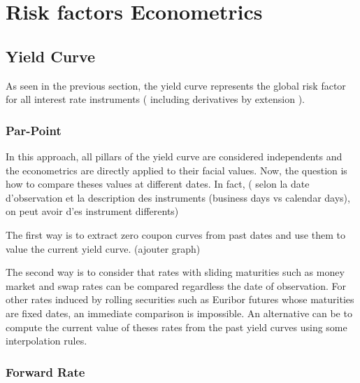 \documentclass[3pt]{article}
\begin{document}
\bigskip

\bigskip

\bigskip

\bigskip

\bigskip

\bigskip

\bigskip

\bigskip

\section{Risk factors Econometrics}

\subsection{Yield Curve}

\bigskip As seen in the previous section, the yield curve represents the
global risk factor for all interest rate instruments ( including derivatives
by extension ).

\subsubsection{Par-Point}

In this approach, all pillars of the yield curve are considered independents
and the econometrics are directly applied to their facial values. Now, the
question is how to compare theses values at different dates. In fact, (
selon la date d'observation et la description des instruments (business days
vs calendar days), on peut avoir d'es instrument differents)

\bigskip

The first way is to extract zero coupon curves from past dates and use them
to value the current yield curve. (ajouter graph)

\bigskip

\bigskip

\bigskip

The second way is to consider that rates with sliding maturities such as
money market and swap rates can be compared regardless the date of
observation. For other rates induced by rolling securities such as Euribor
futures whose maturities are fixed dates, an immediate comparison is
impossible. An alternative can be to compute the current value of theses
rates from the past yield curves using some interpolation rules.

\subsubsection{Forward Rate}
\end{document}
